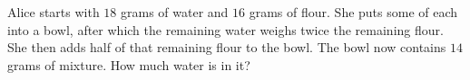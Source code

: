 Alice starts with $18$ grams of water and $16$ grams of flour. She puts some of each into a bowl, after which the remaining water weighs twice the remaining flour. She then adds half of that remaining flour to the bowl. The bowl now contains $14$ grams of mixture. How much water is in it?
